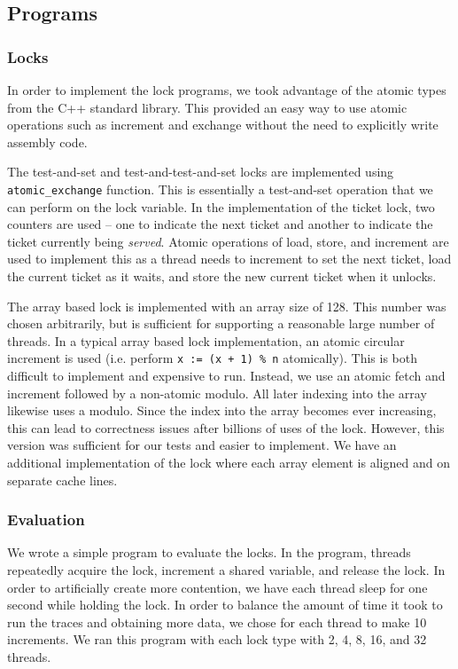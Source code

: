 \documentclass{article}
\begin{document}
\subsection{Programs}
\subsubsection{Locks}
In order to implement the lock programs, we took advantage of the atomic types from the C++ standard library.  This provided an easy way to use atomic operations such as increment and exchange without the need to explicitly write assembly code.

The test-and-set and test-and-test-and-set locks are implemented using {\tt atomic\_exchange} function.  This is essentially a test-and-set operation that we can perform on the lock variable.  In the implementation of the ticket lock, two counters are used -- one to indicate the next ticket and another to indicate the ticket currently being {\it served}.  Atomic operations of load, store, and increment are used to implement this as a thread needs to increment to set the next ticket, load the current ticket as it waits, and store the new current ticket when it unlocks.

The array based lock is implemented with an array size of 128.  This number was chosen arbitrarily, but is sufficient for supporting a reasonable large number of threads.  In a typical array based lock implementation, an atomic circular increment is used (i.e. perform {\tt x := (x + 1) \% n} atomically).  This is both difficult to implement and expensive to run.  Instead, we use an atomic fetch and increment followed by a non-atomic modulo.  All later indexing into the array likewise uses a modulo.  Since the index into the array becomes ever increasing, this can lead to correctness issues after billions of uses of the lock.  However, this version was sufficient for our tests and easier to implement.  We have an additional implementation of the lock where each array element is aligned and on separate cache lines.

\subsubsection{Evaluation}
We wrote a simple program to evaluate the locks.  In the program, threads repeatedly acquire the lock, increment a shared variable, and release the lock.  In order to artificially create more contention, we have each thread sleep for one second while holding the lock.  In order to balance the amount of time it took to run the traces and obtaining more data, we chose for each thread to make 10 increments.  We ran this program with each lock type with 2, 4, 8, 16, and 32 threads.
\end{document}
